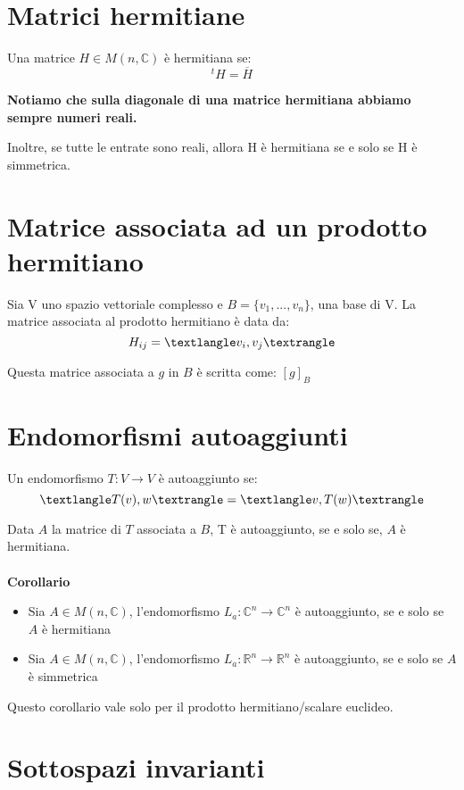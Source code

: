 \documentclass[a4paper, 10pt]{article}
\begin{document}
\section{Matrici hermitiane}

Una matrice $H \in M(n, \mathbb{C})$ è hermitiana se: $$^tH = \overline{H}$$

\textbf{Notiamo che sulla diagonale di una matrice hermitiana abbiamo sempre numeri reali.}

Inoltre, se tutte le entrate sono reali, allora H è hermitiana se e solo se H è simmetrica.

\section{Matrice associata ad un prodotto hermitiano}

Sia V uno spazio vettoriale complesso e $B=\{v_1, ..., v_n\}$, una base di V. La matrice associata al prodotto hermitiano è data da: $$H_{ij} = \textlangle v_i, v_j \textrangle$$

Questa matrice associata a $g$ in $B$ è scritta come: $[g]_B$

\section{Endomorfismi autoaggiunti}

Un endomorfismo $T: V \rightarrow V$ è autoaggiunto se: $$\textlangle T(v), w \textrangle = \textlangle v, T(w) \textrangle$$

Data $A$ la matrice di $T$ associata a $B$, T è autoaggiunto, se e solo se, $A$ è hermitiana.
\\\\
\textbf{Corollario}

\begin{itemize}
	\item Sia $A \in M(n, \mathbb{C})$, l'endomorfismo $L_a: \mathbb{C}^n \rightarrow \mathbb{C}^n$ è autoaggiunto, se e solo se $A$ è hermitiana
	\item Sia $A \in M(n, \mathbb{C})$, l'endomorfismo $L_a: \mathbb{R}^n \rightarrow \mathbb{R}^n$ è autoaggiunto, se e solo se $A$ è simmetrica
\end{itemize}
Questo corollario vale solo per il prodotto hermitiano/scalare euclideo.

\section{Sottospazi invarianti}
\end{document}
